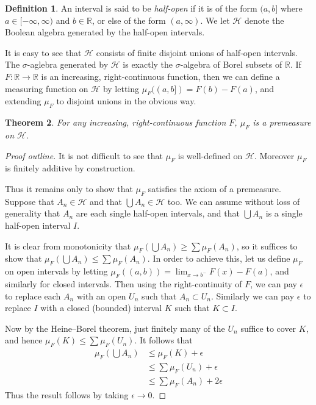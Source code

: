 \documentclass[10pt,oneside]{amsbook}
\newcommand{\RR}{{\mathbb R}}
\theoremstyle{definition}
\theoremstyle{plain}
\newtheorem{thm}{Theorem}[section]
\theoremstyle{definition}
\newtheorem{defn}[thm]{Definition}
\theoremstyle{remark}
\numberwithin{equation}{section}
\numberwithin{figure}{section}
\begin{document}
\begin{defn}
  An interval is said to be \emph{half-open} if it is of the form $(a,b]$ where $a\in[-\infty,\infty)$ and $b\in\RR$, or else of the form $(a,\infty)$. We let $\mathcal H$ denote the Boolean algebra generated by the half-open intervals.
\end{defn}

It is easy to see that $\mathcal H$ consists of finite disjoint unions of half-open intervals. The $\sigma$-aglebra generated by $\mathcal H$ is exactly the $\sigma$-algebra of Borel subsets of $\RR$. If $F\colon\RR\to\RR$ is an increasing, right-continuous function, then we can define a measuring function on $\mathcal H$ by letting $\mu_F((a,b])=F(b)-F(a)$, and extending $\mu_F$ to disjoint unions in the obvious way.

\begin{thm}
  For any increasing, right-continuous function $F$, $\mu_F$ is a premeasure on $\mathcal H$.
\end{thm}

\begin{proof}[Proof outline]
  It is not difficult to see that $\mu_F$ is well-defined on $\mathcal H$. Moreover $\mu_F$ is finitely additive by construction.

  Thus it remains only to show that $\mu_F$ satisfies the axiom of a premeasure. Suppose that $A_n\in\mathcal H$ and that $\bigcup A_n\in\mathcal H$ too. We can assume without loss of generality that $A_n$ are each single half-open intervals, and that $\bigcup A_n$ is a single half-open interval $I$.

  It is clear from monotonicity that $\mu_F(\bigcup A_n)\geq\sum\mu_F(A_n)$, so it suffices to show that $\mu_F(\bigcup A_n)\leq\sum\mu_F(A_n)$. In order to achieve this, let us define $\mu_F$ on open intervals by letting $\mu_F((a,b))=\lim_{x\to b^-}F(x)-F(a)$, and similarly for closed intervals. Then using the right-continuity of $F$, we can pay $\epsilon$ to replace each $A_n$ with an open $U_n$ such that $A_n\subset U_n$. Similarly we can pay $\epsilon$ to replace $I$ with a closed (bounded) interval $K$ such that $K\subset I$.

  Now by the Heine--Borel theorem, just finitely many of the $U_n$ suffice to cover $K$, and hence $\mu_F(K)\leq\sum\mu_F(U_n)$. It follows that
  \begin{align*}
    \mu_F(\bigcup A_n)
    &\leq\mu_F(K)+\epsilon\\
    &\leq\sum\mu_F(U_n)+\epsilon\\
    &\leq\sum\mu_F(A_n)+2\epsilon
  \end{align*}
  Thus the result follows by taking $\epsilon\to0$.
\end{proof}
\end{document}
